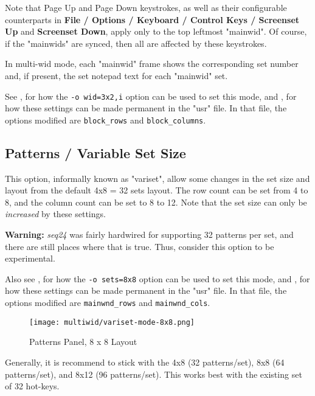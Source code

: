    Note that Page Up and Page Down keystrokes, as well as their
   configurable counterparts in
   \textbf{File / Options / Keyboard / Control Keys / Screenset Up}
   and \textbf{Screenset Down}, apply only to the top leftmost "mainwid".
   Of course, if the "mainwids" are synced, then all are affected by these
   keystrokes.

   In multi-wid mode, each "mainwid" frame shows the corresponding set number
   and, if present, the set notepad text for each "mainwid" set.

   See 
   , for how the
   \texttt{-o wid=3x2,i} option can be used to set this mode, and
   , for
   how these settings can be made permanent in the "usr" file.
   In that file, the options modified are \texttt{block\_rows} and
   \texttt{block\_columns}.

\subsection{Patterns / Variable Set Size}
\label{subsec:seq64_patterns_panel_variset}

   This option, informally known as "variset", allow some changes in
   the set size and layout from the default 4x8 = 32 sets layout.
   The row count can be set from 4 to 8, and the column count can be set to 8
   to 12.  Note that the set size can only be \textsl{increased} by these
   settings.

   \textbf{Warning:}
   \textsl{seq24} was fairly hardwired for supporting 32 patterns per
   set, and there are still places where that is true.  Thus,
   consider this option to be experimental.

   Also see 
   , for how the
   \texttt{-o sets=8x8} option can be used to set this mode, and
   , for
   how these settings can be made permanent in the "usr" file.
   In that file, the options modified are \texttt{mainwnd\_rows} and
   \texttt{mainwnd\_cols}.

\begin{figure}[H]
   \centering 
   \texttt{[image: multiwid/variset-mode-8x8.png]}
   \caption{Patterns Panel, 8 x 8 Layout}
   \label{fig:pattern_window_bottom_panel_variset}
\end{figure}

   Generally, it is recommend to stick with the 4x8 (32 patterns/set),
   8x8 (64 patterns/set), and 8x12 (96 patterns/set).  This works best with the
   existing set of 32 hot-keys.

